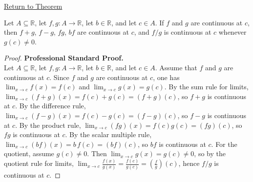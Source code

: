 \newpage
{}
\label{prf:continuity-algebra-at-a-point}

\begin{remark*}[Return]
\hyperref[thm:continuity-algebra-at-a-point]{Return to Theorem}
\end{remark*}

\begin{theorem*}
Let $A \subseteq \mathbb{R}$, let $f,g : A \to \mathbb{R}$, let $b \in \mathbb{R}$, and let $c \in A$. If $f$ and $g$ are continuous at $c$, then $f+g$, $f-g$, $fg$, $bf$ are continuous at $c$, and $f/g$ is continuous at $c$ whenever $g(c) \neq 0$.
\end{theorem*}

\begin{proof}
\textbf{Professional Standard Proof.}~\\
Let $A \subseteq \mathbb{R}$, let $f,g : A \to \mathbb{R}$, let $b \in \mathbb{R}$, and let $c \in A$. Assume that $f$ and $g$ are continuous at $c$. Since $f$ and $g$ are continuous at $c$, one has $\lim_{x\to c} f(x)=f(c)$ and $\lim_{x\to c} g(x)=g(c)$. By the sum rule for limits, $\lim_{x\to c} (f+g)(x)=f(c)+g(c)=(f+g)(c)$, so $f+g$ is continuous at $c$. By the difference rule, $\lim_{x\to c} (f-g)(x)=f(c)-g(c)=(f-g)(c)$, so $f-g$ is continuous at $c$. By the product rule, $\lim_{x\to c} (fg)(x)=f(c)g(c)=(fg)(c)$, so $fg$ is continuous at $c$. By the scalar multiple rule, $\lim_{x\to c} (bf)(x)=b\,f(c)=(bf)(c)$, so $bf$ is continuous at $c$. For the quotient, assume $g(c) \neq 0$. Then $\lim_{x\to c} g(x)=g(c) \neq 0$, so by the quotient rule for limits, $\lim_{x\to c} \frac{f(x)}{g(x)} = \frac{f(c)}{g(c)} = \left(\frac{f}{g}\right)(c)$, hence $f/g$ is continuous at $c$.
\end{proof}

